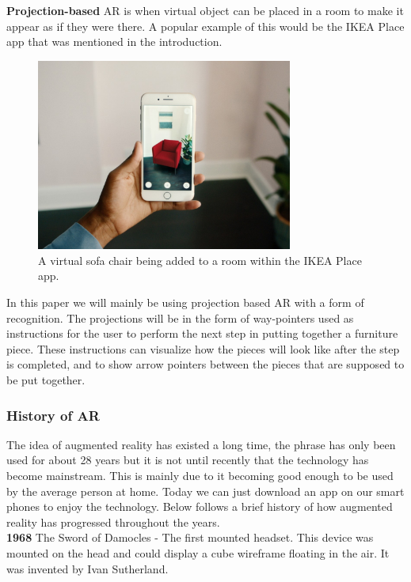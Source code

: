 \textbf{Projection-based} AR is when virtual object can be placed in a room to make it appear as if they were there. A popular example of this would be the IKEA Place app that was mentioned in the introduction.  \\

\begin{figure}[hbtp]
\begin{center}
\includegraphics[width = 0.75\textwidth]{./Images/ikeaplace.jpg} 
\caption{A virtual sofa chair being added to a room within the IKEA Place app.}
\end{center}
\end{figure}

In this paper we will mainly be using projection based AR with a form of recognition. The projections will be in the form of way-pointers used as instructions for the user to perform the next step in putting together a furniture piece. These instructions can visualize how the pieces will look like after the step is completed, and to show arrow pointers between the pieces that are supposed to be put together.

\subsubsection{History of AR}
The idea of augmented reality has existed a long time, the phrase has only been used for about 28 years but it is not until recently that the technology has become mainstream.
This is mainly due to it becoming good enough to be used by the average person at home. Today we can just download an app on our smart phones to enjoy the technology. Below follows a brief history of how augmented reality has progressed throughout the years.\\

\textbf{1968}
The Sword of Damocles - The first mounted headset.
This device was mounted on the head and could display a cube wireframe floating in the air. It was invented by Ivan Sutherland.\\

